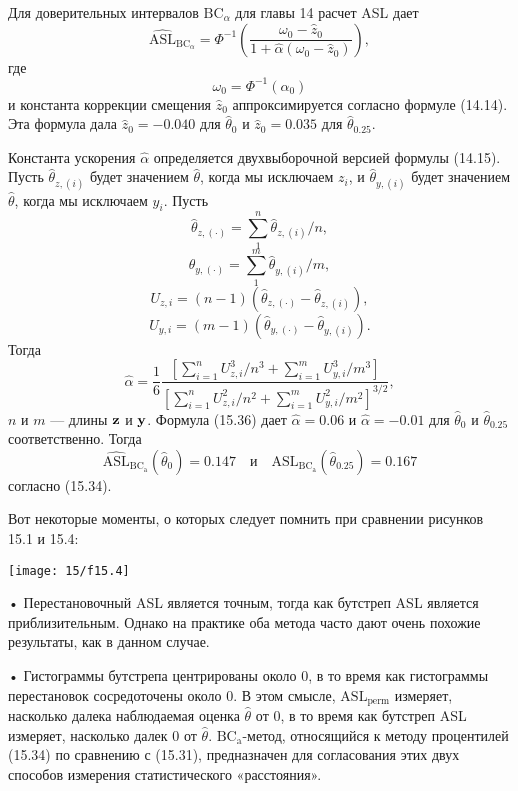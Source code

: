Для доверительных интервалов $\text{BC}_{\alpha}$ для главы 14 расчет ASL дает
\begin{equation}
	\widehat{\text{ASL}}_{\text{BC}_{\alpha}} = \Phi^{-1} \left( \dfrac{\omega_0 - \hat{z}_0}{1 + \hat{\alpha}(\omega_0 - \hat{z}_0)} \right),
\end{equation}
где
\begin{equation}
	\omega_0 = \Phi^{-1}(\alpha_0)
\end{equation}
и константа коррекции смещения $\hat{z}_0$ аппроксимируется согласно формуле (14.14). Эта формула дала $\hat{z}_0 = -0.040$ для $\hat{\theta}_0$ и $\hat{z}_0 = 0.035$ для $\hat{\theta}_{0.25}$.

Константа ускорения $\hat{\alpha}$ определяется двухвыборочной версией формулы (14.15). Пусть $\hat{\theta}_{z,(i)}$ будет значением $\hat{\theta}$, когда мы исключаем $z_i$, и $\hat{\theta}_{y,(i)}$ будет значением $\hat{\theta}$, когда мы исключаем $y_i$. Пусть 
$$\hat{\theta}_{z,(\cdot)} = \sum\limits_{1}^{n} \hat{\theta}_{z,(i)}/n,$$
$$\hat{\theta}_{y,(\cdot)} = \sum\limits_{1}^{m} \hat{\theta}_{y,(i)}/m,$$
$$U_{z,i} = (n-1)(\hat{\theta}_{z,(\cdot)} - \hat{\theta}_{z,(i)}),$$
$$U_{y,i} = (m-1)(\hat{\theta}_{y,(\cdot)} - \hat{\theta}_{y,(i)}).$$
Тогда
\begin{equation}
	\hat{\alpha} = \dfrac{1}{6} \dfrac{[\sum_{i=1}^n U_{z,i}^{3} / n^3 + \sum_{i=1}^m U_{y,i}^3 / m^3]}{[\sum_{i=1}^n U_{z,i}^2 /n^2 + \sum_{i=1}^m U_{y,i}^2 / m^2]^{3/2}},
\end{equation}
$n$ и $m$ --- длины $\bf{z}$ и $\bf{y}$. Формула (15.36) дает $\hat{\alpha} = 0.06$ и $\hat{\alpha} = -0.01$ для $\hat{\theta}_0$ и $\hat{\theta}_{0.25}$ соответственно. Тогда
\begin{equation}
	\widehat{\text{ASL}}_{\text{BC}_{\text{a}}}(\hat{\theta}_0) = 0.147 \quad \text{и} \quad \widehat{\text{ASL}}_{\text{BC}_{\text{a}}}(\hat{\theta}_{0.25}) = 0.167
\end{equation}
согласно (15.34).

Вот некоторые моменты, о которых следует помнить при сравнении рисунков 15.1 и 15.4:

\noindent
\texttt{[image: 15/f15.4]}
\newline

• Перестановочный ASL является точным, тогда как бутстреп ASL является приблизительным. Однако на практике оба метода часто дают очень похожие результаты, как в данном случае.

• Гистограммы бутстрепа центрированы около 0, в то время как гистограммы перестановок сосредоточены около 0. В этом смысле, $\text{ASL}_\text{perm}$ измеряет, насколько далека наблюдаемая оценка $\hat{\theta}$ от 0, в то время как бутстреп ASL измеряет, насколько далек 0 от $\hat{\theta}$. $\text{BC}_\text{a}$-метод, относящийся к методу процентилей (15.34) по сравнению с (15.31), предназначен для согласования этих двух способов измерения статистического «расстояния».

